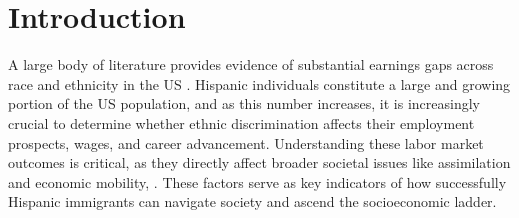 
\section{Introduction}

A large body of literature provides evidence of substantial earnings gaps across race and ethnicity in the US \autocite{bayer2018divergent, charles2008prejudice}. Hispanic individuals constitute a large and growing portion of the US population, and as this number increases, it is increasingly crucial to determine whether ethnic discrimination affects their employment prospects, wages, and career advancement. Understanding these labor market outcomes is critical, as they directly affect broader societal issues like assimilation and economic mobility, \autocite{chettyUnitedStatesStill2014, chettyEffectsExposureBetter2016,chettyFadingAmericanDream2017}. These factors serve as key indicators of how successfully Hispanic immigrants can navigate society and ascend the socioeconomic ladder.

